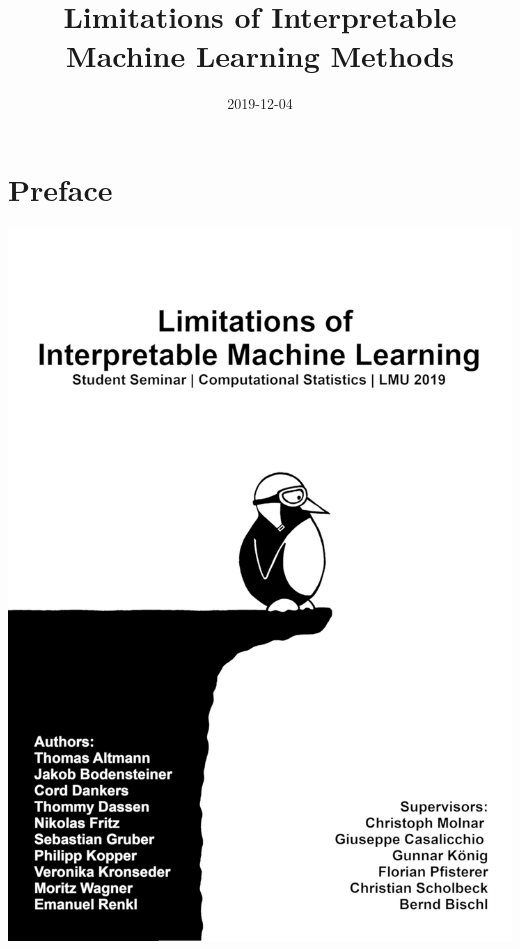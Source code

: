 \documentclass[]{krantz}
\title{Limitations of Interpretable Machine Learning Methods}
\date{2019-12-04}
\begin{document}
\maketitle


\thispagestyle{empty}

\begin{center}
\end{center}

\setlength{\abovedisplayskip}{-5pt}
\setlength{\abovedisplayshortskip}{-5pt}

{
\hypersetup{linkcolor=black}
\setcounter{tocdepth}{0}
\tableofcontents
}
\chapter*{Preface}\label{preface}


\begin{center}\includegraphics[width=1\linewidth]{images/cover} \end{center}
\end{document}
